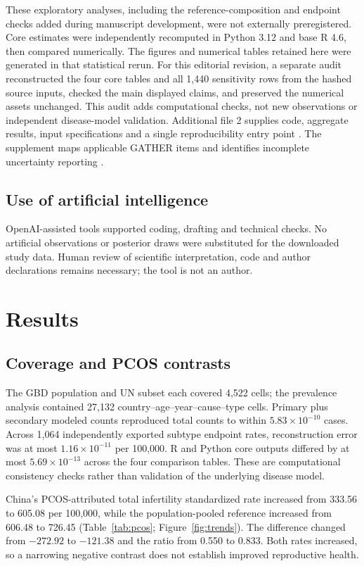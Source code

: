\documentclass[11pt,a4paper]{article}
\begin{document}
These exploratory analyses, including the reference-composition and endpoint checks added during manuscript development, were not externally preregistered. Core estimates were independently recomputed in Python 3.12 and base R 4.6, then compared numerically. The figures and numerical tables retained here were generated in that statistical rerun. For this editorial revision, a separate audit reconstructed the four core tables and all 1,440 sensitivity rows from the hashed source inputs, checked the main displayed claims, and preserved the numerical assets unchanged. This audit adds computational checks, not new observations or independent disease-model validation. Additional file 2 supplies code, aggregate results, input specifications and a single reproducibility entry point \cite{repository}. The supplement maps applicable GATHER items and identifies incomplete uncertainty reporting \cite{gather}.

\subsection{Use of artificial intelligence}
OpenAI-assisted tools supported coding, drafting and technical checks. No artificial observations or posterior draws were substituted for the downloaded study data. Human review of scientific interpretation, code and author declarations remains necessary; the tool is not an author.

\section{Results}
\subsection{Coverage and PCOS contrasts}
The GBD population and UN subset each covered 4,522 cells; the prevalence analysis contained 27,132 country--age--year--cause--type cells. Primary plus secondary modeled counts reproduced total counts to within $5.83\times10^{-10}$ cases. Across 1,064 independently exported subtype endpoint rates, reconstruction error was at most $1.16\times10^{-11}$ per 100,000. R and Python core outputs differed by at most $5.69\times10^{-13}$ across the four comparison tables. These are computational consistency checks rather than validation of the underlying disease model.

China's PCOS-attributed total infertility standardized rate increased from 333.56 to 605.08 per 100,000, while the population-pooled reference increased from 606.48 to 726.45 (Table~\ref{tab:pcos}; Figure~\ref{fig:trends}). The difference changed from $-272.92$ to $-121.38$ and the ratio from 0.550 to 0.833. Both rates increased, so a narrowing negative contrast does not establish improved reproductive health.
\end{document}
